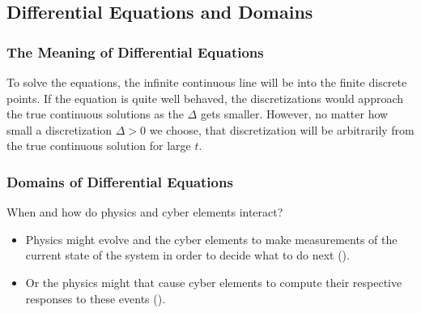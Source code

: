 \subsection{Differential Equations and Domains}

\subsubsection{The Meaning of Differential Equations}


To solve the equations, the infinite continuous line will be 
 into the finite discrete points.
If the equation is quite well behaved,
the discretizations would approach the true continuous solutions as the 
$\Delta$ gets smaller.
However, no matter how small a discretization $\Delta > 0$ we choose,
that discretization will be arbitrarily  
from the true continuous solution for large $t$.

\subsubsection{Domains of Differential Equations}

When and how do physics and cyber elements interact?
\vspace{-.5cm}
\begin{itemize}
  \item Physics might evolve and the cyber elements 
     to make measurements of 
    the current state of the system in order to decide what to do next 
    ().
  \item Or the physics might  
    that cause cyber elements to compute their respective responses to 
    these events ().
\end{itemize}

